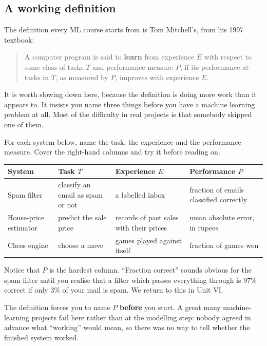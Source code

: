 \documentclass[11pt]{article}
\begin{document}
\subsection{A working definition}

The definition every ML course starts from is Tom Mitchell's, from his 1997
textbook:

\begin{quote}
A computer program is said to \textbf{learn} from experience $E$ with respect to
some class of tasks $T$ and performance measure $P$, if its performance at tasks
in $T$, as measured by $P$, improves with experience $E$.
\end{quote}

It is worth slowing down here, because the definition is doing more work than it
appears to. It insists you name three things before you have a machine learning
problem at all. Most of the difficulty in real projects is that somebody skipped
one of them.

\begin{worked}
For each system below, name the task, the experience and the performance
measure. Cover the right-hand columns and try it before reading on.

\begin{center}
\begin{tabular}{@{}p{3.1cm}p{3.2cm}p{3.6cm}p{4.2cm}@{}}
\toprule
\textbf{System} & \textbf{Task $T$} & \textbf{Experience $E$} & \textbf{Performance $P$}\\
\midrule
Spam filter & classify an email as spam or not & a labelled inbox & fraction of emails classified correctly\\[3pt]
House-price estimator & predict the sale price & records of past sales with their prices & mean absolute error, in rupees\\[3pt]
Chess engine & choose a move & games played against itself & fraction of games won\\
\bottomrule
\end{tabular}
\end{center}

Notice that $P$ is the hardest column. ``Fraction correct'' sounds obvious for
the spam filter until you realise that a filter which passes everything through
is 97\% correct if only 3\% of your mail is spam. We return to this in Unit VI.
\end{worked}

\begin{keyidea}
The definition forces you to name $P$ \textbf{before} you start. A great many
machine-learning projects fail here rather than at the modelling step: nobody
agreed in advance what ``working'' would mean, so there was no way to tell
whether the finished system worked.
\end{keyidea}
\end{document}
